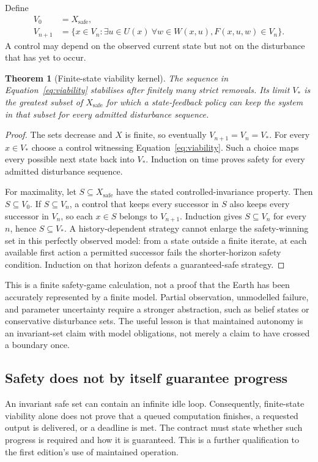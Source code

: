 \documentclass[11pt,a4paper]{article}
\newtheorem{theorem}{Theorem}[section]
\theoremstyle{definition}
\theoremstyle{remark}
\begin{document}
Define
\begin{align}
 V_0&=X_{\mathrm{safe}},\label{eq:V0}\\
 V_{n+1}&=\{x\in V_n:\exists u\in U(x)\ \forall w\in W(x,u),
                       F(x,u,w)\in V_n\}.\label{eq:viability}
\end{align}
A control may depend on the observed current state but not on the disturbance that has yet to occur.

\begin{theorem}[Finite-state viability kernel]\label{thm:viability}
The sequence in Equation~\eqref{eq:viability} stabilises after finitely many strict removals. Its limit $V_*$ is the greatest subset of $X_{\mathrm{safe}}$ for which a state-feedback policy can keep the system in that subset for every admitted disturbance sequence.
\end{theorem}
\begin{proof}
The sets decrease and $X$ is finite, so eventually $V_{n+1}=V_n=V_*$. For every $x\in V_*$ choose a control witnessing Equation~\eqref{eq:viability}. Such a choice maps every possible next state back into $V_*$. Induction on time proves safety for every admitted disturbance sequence.

For maximality, let $S\subseteq X_{\mathrm{safe}}$ have the stated controlled-invariance property. Then $S\subseteq V_0$. If $S\subseteq V_n$, a control that keeps every successor in $S$ also keeps every successor in $V_n$, so each $x\in S$ belongs to $V_{n+1}$. Induction gives $S\subseteq V_n$ for every $n$, hence $S\subseteq V_*$. A history-dependent strategy cannot enlarge the safety-winning set in this perfectly observed model: from a state outside a finite iterate, at each available first action a permitted successor fails the shorter-horizon safety condition. Induction on that horizon defeats a guaranteed-safe strategy.
\end{proof}
This is a finite safety-game calculation, not a proof that the Earth has been accurately represented by a finite model. Partial observation, unmodelled failure, and parameter uncertainty require a stronger abstraction, such as belief states or conservative disturbance sets. The useful lesson is that maintained autonomy is an invariant-set claim with model obligations, not merely a claim to have crossed a boundary once.

\subsection{Safety does not by itself guarantee progress}\label{sec:progress}
An invariant safe set can contain an infinite idle loop. Consequently, finite-state viability alone does not prove that a queued computation finishes, a requested output is delivered, or a deadline is met. The contract must state whether such progress is required and how it is guaranteed. This is a further qualification to the first edition's use of maintained operation.
\end{document}
